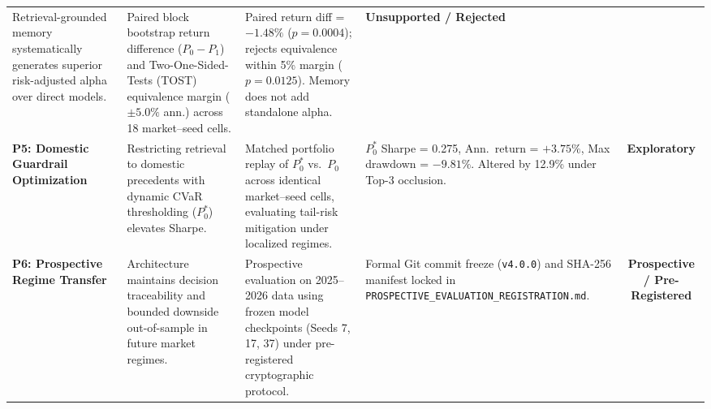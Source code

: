 \begin{table}[t]
\begin{tabularx}{\textwidth}{p{3.2cm} p{2.8cm} X p{2.2cm} c}
Retrieval-grounded memory systematically generates superior risk-adjusted alpha over direct models. & 
Paired block bootstrap return difference ($P_0 - P_1$) and Two-One-Sided-Tests (TOST) equivalence margin ($\pm 5.0\%$ ann.) across 18 market--seed cells. & 
Paired return diff = $-1.48\%$ ($p = 0.0004$); rejects equivalence within 5\% margin ($p = 0.0125$). Memory does not add standalone alpha. & 
\textbf{Unsupported / Rejected} \\
\addlinespace
\textbf{P5: Domestic Guardrail Optimization} & 
Restricting retrieval to domestic precedents with dynamic CVaR thresholding ($P_0^*$) elevates Sharpe. & 
Matched portfolio replay of $P_0^*$ vs.\ $P_0$ across identical market--seed cells, evaluating tail-risk mitigation under localized regimes. & 
$P_0^*$ Sharpe = 0.275, Ann.\ return = $+3.75\%$, Max drawdown = $-9.81\%$. Altered by 12.9\% under Top-3 occlusion. & 
\textbf{Exploratory} \\
\addlinespace
\textbf{P6: Prospective Regime Transfer} & 
Architecture maintains decision traceability and bounded downside out-of-sample in future market regimes. & 
Prospective evaluation on 2025--2026 data using frozen model checkpoints (Seeds 7, 17, 37) under pre-registered cryptographic protocol. & 
Formal Git commit freeze (\texttt{v4.0.0}) and SHA-256 manifest locked in \texttt{PROSPECTIVE\_EVALUATION\_REGISTRATION.md}. & 
\textbf{Prospective / Pre-Registered} \\
\bottomrule
\end{tabularx}
\end{table}
